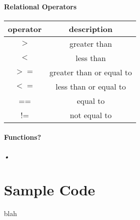 \documentclass[12pt]{article}
\begin{document}
\paragraph{Relational Operators}
\begin{center}
\begin{tabular}{ c | c } 

  operator & description \\
 \hline
 $>$ 		& 		greater than \\ 
 $<$		&		less than \\
 $>=$	& 		greater than or equal to \\ 
 $<=$	& 		less than or equal to \\
 ==		& 		equal to \\ 
 !=			& 		not equal to \\
 
\end{tabular}
\end{center}

\paragraph{Functions?}
\textsl{•}

\section{Sample Code}
blah



\end{document}
